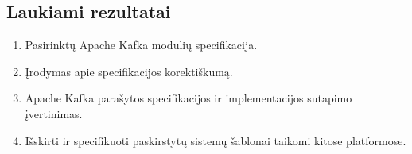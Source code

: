 \documentclass{VUMIFPSmagistrinis}
\begin{document}
	\subsection{Laukiami rezultatai}
		\begin{enumerate}
			\item{Pasirinktų Apache Kafka modulių specifikacija.}
			\item{Įrodymas apie specifikacijos korektiškumą.}
			\item{Apache Kafka parašytos specifikacijos ir implementacijos sutapimo įvertinimas.}
			\item{Išskirti ir specifikuoti paskirstytų sistemų šablonai taikomi kitose platformose.}
		\end{enumerate}
	
	\printbibliography[heading=bibintoc] 


\appendix
\end{document}
